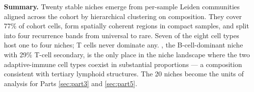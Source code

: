 \medskip

\noindent\textbf{Summary.} Twenty stable niches emerge from per-sample Leiden communities aligned across the cohort by hierarchical clustering on composition. They cover 77\% of cohort cells, form spatially coherent regions in compact samples, and split into four recurrence bands from universal to rare. Seven of the eight cell types host one to four niches; T cells never dominate any. , the B-cell-dominant niche with 29\% T-cell secondary, is the only place in the niche landscape where the two adaptive-immune cell types coexist in substantial proportions --- a composition consistent with tertiary lymphoid structures. The 20 niches become the units of analysis for Parts \ref{sec:part3} and \ref{sec:part5}.